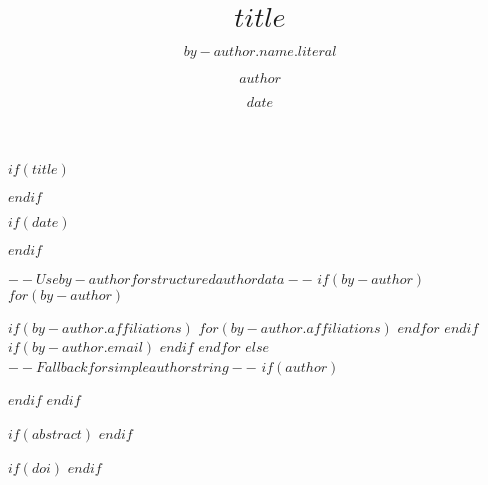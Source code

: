 $if(title)$
\title{$title$}
$endif$

$if(date)$
\date{$date$}
$endif$


$-- Use by-author for structured author data --$
$if(by-author)$
$for(by-author)$
\author{$by-author.name.literal$}
$if(by-author.affiliations)$
$for(by-author.affiliations)$
$endfor$
$endif$
$if(by-author.email)$
$endif$
$endfor$
$else$
$-- Fallback for simple author string --$
$if(author)$
\author{$author$}
$endif$
$endif$


$if(abstract)$
%
$endif$

$if(doi)$
$endif$
